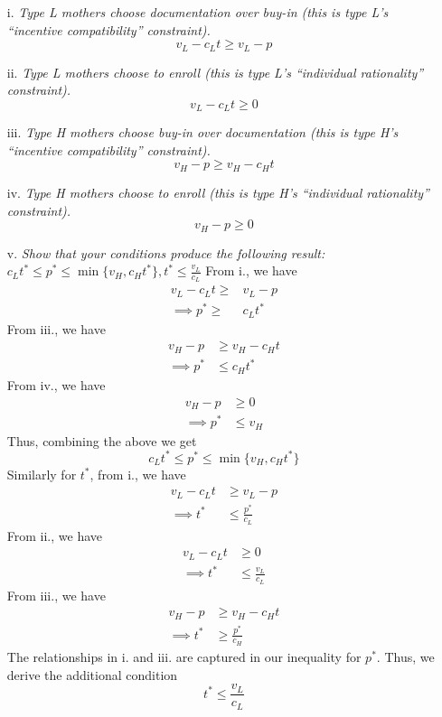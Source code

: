 \documentclass[
]{article}
\begin{document}
\begin{enumerate}
\item[i.] \textit{Type L mothers choose documentation over buy-in (this is type L’s “incentive compatibility” constraint).}
\newline
\newline
\[v_L - c_L t \geq v_L - p\]

\item[ii.] \textit{Type L mothers choose to enroll (this is type L’s “individual rationality” constraint).}
\newline
\newline
\[v_L - c_L t \geq 0\]

\item[iii.] \textit{Type H mothers choose buy-in over documentation (this is type H’s “incentive compatibility”
constraint).}
\newline
\newline
\[v_H - p \geq v_H - c_H t\]

\item[iv.] \textit{Type H mothers choose to enroll (this is type H’s “individual rationality” constraint).}
\newline
\newline
\[v_H - p \geq 0\] 

\item[v.] \textit{ Show that your conditions produce the following result: $c_L t^* \leq p^* \leq \min \{v_H, c_H t^*\}, t^* \leq \frac{v_L}{c_L}$}
\newline
\newline
From i., we have 
\[\begin{aligned} 
v_L - c_L t \geq& v_L - p \\
\implies p^* \geq& c_L t^*
\end{aligned}\] 
From iii., we have 
\[\begin{aligned} 
v_H - p &\geq v_H - c_H t \\
\implies p^* &\leq c_H t^*
\end{aligned}\] 
From iv., we have 
\[\begin{aligned} 
v_H - p &\geq 0\\
\implies p^* &\leq v_H
\end{aligned}\] 
Thus, combining the above we get 
\[c_L t^* \leq p^* \leq \min \{v_H, c_H t^*\}\]
Similarly for $t^*$, from i., we have 
\[\begin{aligned} 
v_L - c_L t &\geq v_L - p \\
\implies t^* &\leq \frac{p^*}{c_L}
\end{aligned}\]
From ii., we have 
\[\begin{aligned} 
v_L - c_L t &\geq 0 \\
\implies t^* &\leq \frac{v_L}{c_L}
\end{aligned}\]
From iii., we have 
\[\begin{aligned} 
v_H - p &\geq v_H - c_H t \\
\implies t^* &\geq \frac{p^*}{c_H}
\end{aligned}\] 
The relationships in i. and iii. are captured in our inequality for $p^*$. Thus, we derive the additional condition 
\[t^* \leq \frac{v_L}{c_L}\]


\end{enumerate}
\end{document}
